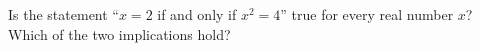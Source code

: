 Is the statement ``$x=2$ if and only if $x^2=4$'' true for every real number $x$? Which of the two implications hold?
